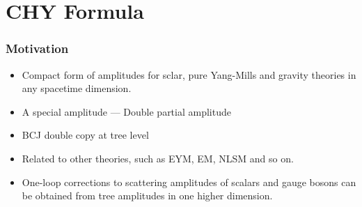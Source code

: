 \documentclass{beamer}
\begin{document}
\section{CHY Formula}
\begin{frame}
    \frametitle{Motivation}
    \begin{itemize}
        \item Compact form of amplitudes for sclar, pure Yang-Mills and gravity theories in any spacetime dimension.
        \item A special amplitude --- Double partial amplitude
        \item BCJ double copy at tree level
        \item Related to other theories, such as EYM, EM, NLSM and so on.
        \item One-loop corrections to scattering amplitudes of scalars and gauge bosons can be obtained from tree amplitudes in one higher dimension. 
    \end{itemize}
\end{frame}
\end{document}
